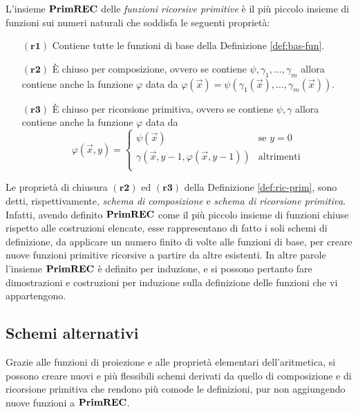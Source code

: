 \documentclass[runningheads,a4paper]{llncs}
\begin{document}
\begin{definition}\label{def:ric-prim}
L'insieme $\mathbf{PrimREC}$ delle \emph{funzioni ricorsive primitive} \`{e}  il pi\`{u} piccolo insieme di funzioni sui numeri naturali che soddisfa le seguenti propriet\`{a}:
\begin{itemize}
\item[$(\mathbf{r1})$] Contiene tutte le funzioni di base della Definizione \ref{def:bas-fun}.
\item[$(\mathbf{r2})$] \`{E} chiuso per composizione, ovvero se contiene $\psi,\gamma_1,\ldots,\gamma_m$ allora contiene anche la funzione $\varphi$ data da $\varphi(\vec x) = \psi(\gamma_1(\vec x),\ldots,\gamma_m(\vec x))$.
\item[$(\mathbf{r3})$] \`{E} chiuso per ricorsione primitiva, ovvero se contiene $\psi,\gamma$ allora contiene anche la funzione $\varphi$ data da 
$$
\varphi(\vec x,y) = 
\begin{cases}
\psi(\vec x) & \mbox{se } y = 0 \\
\gamma(\vec x,y-1,\varphi(\vec x,y-1)) & \mbox{altrimenti} \\
\end{cases}
$$
\end{itemize}
\end{definition}

Le propriet\`{a} di chiusura $(\mathbf{r2})$ ed $(\mathbf{r3})$ della Definizione \ref{def:ric-prim}, sono detti, rispettivamente, \emph{schema di composizione} e \emph{schema di ricorsione primitiva}. Infatti, avendo definito $\mathbf{PrimREC}$ come il pi\`{u} piccolo insieme di funzioni chiuse rispetto alle costruzioni elencate, esse rappresentano di fatto i soli schemi di definizione, da applicare un numero finito di volte alle funzioni di base, per creare nuove funzioni primitive ricorsive a partire da altre esistenti. In altre parole l'insieme $\mathbf{PrimREC}$ \`{e} definito per induzione, e si possono pertanto fare dimostrazioni e costruzioni per induzione sulla definizione delle funzioni che vi appartengono.

\subsection{Schemi alternativi}

Grazie alle funzioni di proiezione e alle propriet\`{a} elementari dell'aritmetica, si possono creare nuovi e pi\`{u} flessibili schemi derivati da quello di composizione e di ricorsione primitiva che rendono pi\`{u} comode le definizioni, pur non aggiungendo nuove funzioni a $\mathbf{PrimREC}$.
\end{document}
